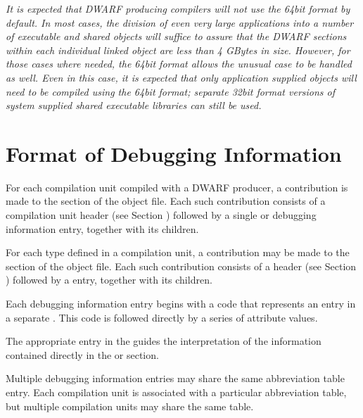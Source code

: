 \textit{It is expected that DWARF producing compilers will not use
the 64\dash bit format by default. In most cases, the division of
even very large applications into a number of executable and
shared objects will suffice to assure that the DWARF sections
within each individual linked object are less than 4 GBytes
in size. However, for those cases where needed, the 64\dash bit
format allows the unusual case to be handled as well. Even
in this case, it is expected that only application supplied
objects will need to be compiled using the 64\dash bit format;
separate 32\dash bit format versions of system supplied shared
executable libraries can still be used.}



\section{Format of Debugging Information}
\label{datarep:formatofdebugginginformation}

For each compilation unit compiled with a DWARF producer,
a contribution is made to the  section of
the object file. Each such contribution consists of a
compilation unit header 
(see Section ) 
followed by a
single  or  debugging
information entry, together with its children.

For each type defined in a compilation unit, a contribution may
be made to the  
section of the object file. Each
such contribution consists of a 
 header 
(see Section ) 
followed by a  entry, together with
its children.

Each debugging information entry begins with a code that
represents an entry in a separate 
. This
code is followed directly by a series of attribute values.

The appropriate entry in the 
 guides the
interpretation of the information contained directly in the
 or 
 section.

Multiple debugging information entries may share the same
abbreviation table entry. Each compilation unit is associated
with a particular abbreviation table, but multiple compilation
units may share the same table.
